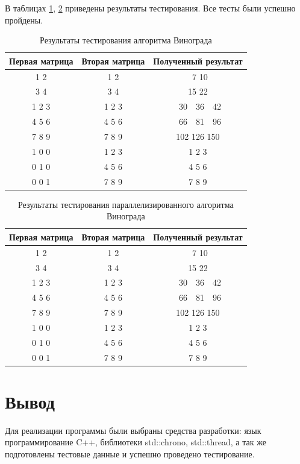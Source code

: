 В таблицах \ref{table:wtest}, \ref{table:pwtest} приведены результаты тестирования. Все тесты были успешно пройдены.

\begin{table}[H]
    \caption{Результаты тестирования алгоритма Винограда}
    \label{table:wtest}
    \centering
    \begin{tabular}{|c|c|c|}
        \hline
        Первая матрица & Вторая матрица & Полученный результат \\
        \hline
        1 2 & 1 2 & \ 7 10 \\
        3 4 & 3 4 & 15 22 \\
        \hline
        1 2 3 & 1 2 3 & \ 30\ \ 36\ \ 42 \\
        4 5 6 & 4 5 6 & \ 66\ \ 81\ \ 96 \\
        7 8 9 & 7 8 9 & 102 126 150 \\
        \hline
        1 0 0 & 1 2 3 & 1 2 3 \\
        0 1 0 & 4 5 6 & 4 5 6 \\
        0 0 1 & 7 8 9 & 7 8 9 \\
        \hline
    \end{tabular}
\end{table}

\begin{table}[H]
    \caption{Результаты тестирования параллелизированного алгоритма Винограда}
    \label{table:pwtest}
    \centering
    \begin{tabular}{|c|c|c|}
        \hline
        Первая матрица & Вторая матрица & Полученный результат \\
        \hline
        1 2 & 1 2 & \ 7 10 \\
        3 4 & 3 4 & 15 22 \\
        \hline
        1 2 3 & 1 2 3 & \ 30\ \ 36\ \ 42 \\
        4 5 6 & 4 5 6 & \ 66\ \ 81\ \ 96 \\
        7 8 9 & 7 8 9 & 102 126 150 \\
        \hline
        1 0 0 & 1 2 3 & 1 2 3 \\
        0 1 0 & 4 5 6 & 4 5 6 \\
        0 0 1 & 7 8 9 & 7 8 9 \\
        \hline
    \end{tabular}
\end{table}

\section{Вывод}
Для реализации программы были выбраны средства разработки: язык программирование C++, библиотеки std::chrono, std::thread, а так же подготовлены тестовые данные и успешно проведено тестирование.

